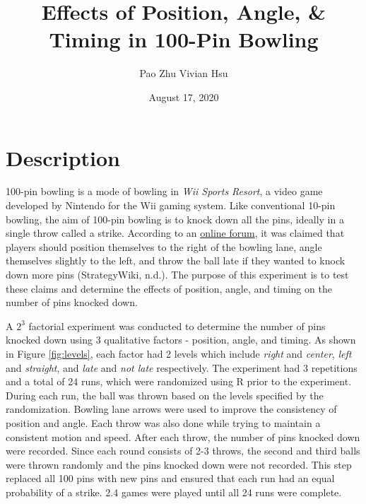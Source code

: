 \documentclass[
]{article}
\title{Effects of Position, Angle, \& Timing in 100-Pin Bowling}
\author{Pao Zhu Vivian Hsu}
\date{August 17, 2020}
\begin{document}
\maketitle

\hypertarget{description}{%
\section{Description}\label{description}}

100-pin bowling is a mode of bowling in \emph{Wii Sports Resort}, a video game developed by Nintendo for the Wii gaming system. Like conventional 10-pin bowling, the aim of 100-pin bowling is to knock down all the pins, ideally in a single throw called a strike. According to an \href{https://strategywiki.org/wiki/Wii_Sports/Bowling}{online forum}, it was claimed that players should position themselves to the right of the bowling lane, angle themselves slightly to the left, and throw the ball late if they wanted to knock down more pins (StrategyWiki, n.d.). The purpose of this experiment is to test these claims and determine the effects of position, angle, and timing on the number of pins knocked down.

A \(2^3\) factorial experiment was conducted to determine the number of pins knocked down using 3 qualitative factors - position, angle, and timing. As shown in Figure \ref{fig:levels}, each factor had 2 levels which include \emph{right} and \emph{center}, \emph{left} and \emph{straight}, and \emph{late} and \emph{not late} respectively. The experiment had 3 repetitions and a total of 24 runs, which were randomized using R prior to the experiment. During each run, the ball was thrown based on the levels specified by the randomization. Bowling lane arrows were used to improve the consistency of position and angle. Each throw was also done while trying to maintain a consistent motion and speed. After each throw, the number of pins knocked down were recorded. Since each round consists of 2-3 throws, the second and third balls were thrown randomly and the pins knocked down were not recorded. This step replaced all 100 pins with new pins and ensured that each run had an equal probability of a strike. 2.4 games were played until all 24 runs were complete.
\end{document}

